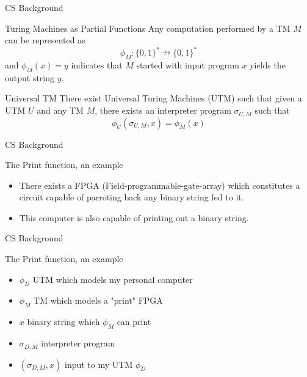 \begin{frame}{CS Background}
    \begin{block}{Turing Machines as Partial Functions}
    Any computation performed by a TM $M$ can be represented as
    \begin{equation*}
        \phi_M:\{0,1\}^* \nrightarrow \{0,1\}^*
    \end{equation*}
    and $\phi_M(x) = y$ indicates that $M$ started with input program $x$ yields the output string $y$.
    \end{block}
    \begin{block}{Universal TM}
    There exist Universal Turing Machines (UTM) such that given a UTM $U$ and any TM $M$, there exists an interpreter program $\sigma_{U,M}$ such that
    \begin{equation*}
        \phi_U(\sigma_{U,M},x) = \phi_M(x)
    \end{equation*}
    \end{block}
\end{frame}

\begin{frame}{CS Background}
\begin{block}{The Print function, an example}
\begin{itemize}
	\item There exists a FPGA (Field-programmable-gate-array) which constitutes a circuit capable of parroting back any binary string fed to it.
	\item This computer is also capable of printing out a binary string.
\end{itemize}
\end{block}
\end{frame}

\begin{frame}{CS Background}
\begin{block}{The Print function, an example}
	\begin{itemize}
		\item $\phi_D$ UTM which models my personal computer
		\item $\phi_M$ TM which models a "print" FPGA
		\item $x$ binary string which $\phi_M$ can print
		\item $\sigma_{D,M}$ interpreter program
		\item $(\sigma_{D,M},x)$ input to my UTM $\phi_D$
	\end{itemize}
\end{block}
\end{frame}

